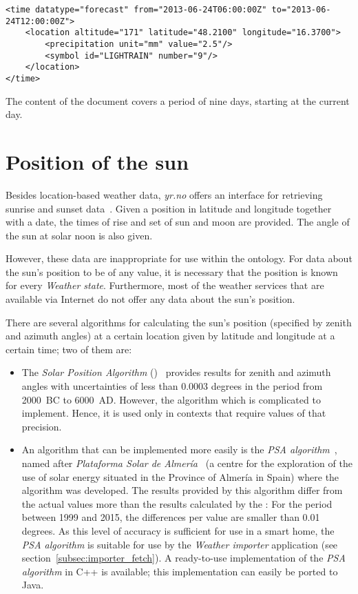 \begin{lstlisting}
<time datatype="forecast" from="2013-06-24T06:00:00Z" to="2013-06-24T12:00:00Z">
	<location altitude="171" latitude="48.2100" longitude="16.3700">
		<precipitation unit="mm" value="2.5"/>
		<symbol id="LIGHTRAIN" number="9"/>
	</location>
</time>
\end{lstlisting}

The content of the  document covers a period of nine days, starting at the current day.

\section{Position of the sun}
\label{sec:sun_position}

Besides location-based weather data, \emph{yr.no} offers an interface for retrieving sunrise and sunset data~\cite{yrno_sunrise}. Given a position in latitude and longitude together with a date, the times of rise and set of sun and moon are provided. The angle of the sun at solar noon is also given.

However, these data are inappropriate for use within the \smarthomeweather ontology. %
For data about the sun's position to be of any value, it is necessary that the position is known for every \emph{Weather state}. Furthermore, most of the weather services that are available via Internet do not offer any data about the sun's position.

There are several algorithms for calculating the sun's position (specified by zenith and azimuth angles) at a certain location given by latitude and longitude at a certain time; two of them are:

\begin{itemize}
  \item The \emph{Solar Position Algorithm} ()~\cite{SPA_algorithm} provides results for zenith and azimuth angles with uncertainties of less than \num{0.0003} degrees in the period from 2000~BC to 6000~AD. However, the algorithm which is complicated to implement. Hence, it is used only in contexts that require values of that precision.
  
  \item An algorithm that can be implemented more easily is the \emph{\acs{PSA} algorithm}~\cite{PSA_algorithm}, named after \emph{Plataforma Solar de Almería}~\cite{PSA} (a centre for the exploration of the use of solar energy situated in the Province of Almería in Spain) where the algorithm was developed. The results provided by this algorithm differ from the actual values more than the results calculated by the : For the period between 1999 and 2015, the differences per value are smaller than \num{0.01} degrees. As this level of accuracy is sufficient for use in a smart home, the \emph{\acs{PSA} algorithm} is suitable for use by the \emph{Weather importer} application (see section~\ref{subsec:importer_fetch}). A ready-to-use implementation of the \emph{\acs{PSA} algorithm} in C++ is available; this implementation can easily be ported to Java.
\end{itemize}


